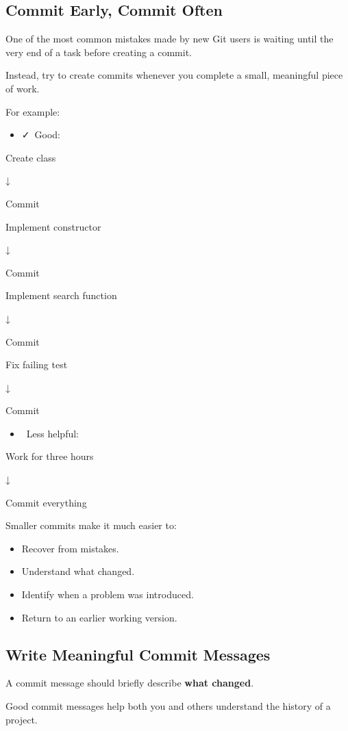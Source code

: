 \documentclass{csc2059practical}
\begin{document}
\subsection{Commit Early, Commit Often}
One of the most common mistakes made by new Git users is waiting until the very end of a task before creating a commit.

Instead, try to create commits whenever you complete a small, meaningful piece of work.

For example:

\begin{itemize}
  \item \faCheck\ Good:
\end{itemize}
Create class

↓

Commit

Implement constructor

↓

Commit

Implement search function

↓

Commit

Fix failing test

↓

Commit

\begin{itemize}
  \item \faTimes\ Less helpful:
\end{itemize}
Work for three hours

↓

Commit everything

Smaller commits make it much easier to:

\begin{itemize}
  \item Recover from mistakes.
  \item Understand what changed.
  \item Identify when a problem was introduced.
  \item Return to an earlier working version.
\end{itemize}
\subsection{Write Meaningful Commit Messages}
A commit message should briefly describe \textbf{what changed}.

Good commit messages help both you and others understand the history of a project.
\end{document}

